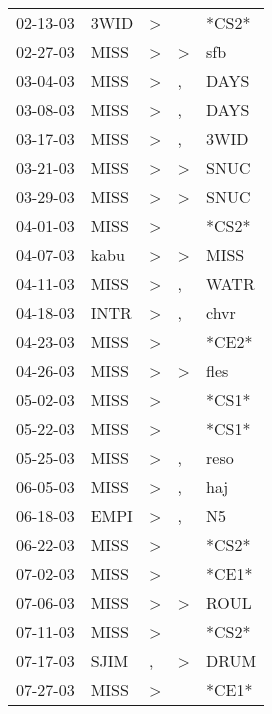 \begin{supertabular}{lllll}
 02-13-03 &   3WID &     \textgreater &                  &  *CS2* \\
 02-27-03 &   MISS &     \textgreater &     \textgreater &    sfb \\
 03-04-03 &   MISS &     \textgreater &                , &   DAYS \\
 03-08-03 &   MISS &     \textgreater &                , &   DAYS \\
 03-17-03 &   MISS &     \textgreater &                , &   3WID \\
 03-21-03 &   MISS &     \textgreater &     \textgreater &   SNUC \\
 03-29-03 &   MISS &     \textgreater &     \textgreater &   SNUC \\
 04-01-03 &   MISS &     \textgreater &                  &  *CS2* \\
 04-07-03 &   kabu &     \textgreater &     \textgreater &   MISS \\
 04-11-03 &   MISS &     \textgreater &                , &   WATR \\
 04-18-03 &   INTR &     \textgreater &                , &   chvr \\
 04-23-03 &   MISS &     \textgreater &                  &  *CE2* \\
 04-26-03 &   MISS &     \textgreater &     \textgreater &   fles \\
 05-02-03 &   MISS &     \textgreater &                  &  *CS1* \\
 05-22-03 &   MISS &     \textgreater &                  &  *CS1* \\
 05-25-03 &   MISS &     \textgreater &                , &   reso \\
 06-05-03 &   MISS &     \textgreater &                , &    haj \\
 06-18-03 &   EMPI &     \textgreater &                , &     N5 \\
 06-22-03 &   MISS &     \textgreater &                  &  *CS2* \\
 07-02-03 &   MISS &     \textgreater &                  &  *CE1* \\
 07-06-03 &   MISS &     \textgreater &     \textgreater &   ROUL \\
 07-11-03 &   MISS &     \textgreater &                  &  *CS2* \\
 07-17-03 &   SJIM &                , &     \textgreater &   DRUM \\
 07-27-03 &   MISS &     \textgreater &                  &  *CE1* \\

\end{supertabular}
